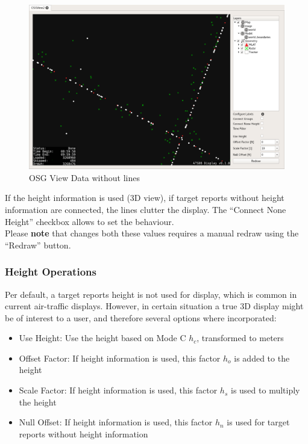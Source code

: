 {\begin{figure}[H]
    \hspace*{-2cm}
    \includegraphics[width=18cm,frame]{../screenshots/osgview_no_lines.png}
  \caption{OSG View Data without lines}
\end{figure}

If the height information is used (3D view), if target reports without height information are connected, the lines clutter the display. The ``Connect None Height'' checkbox allows to set the behaviour. \\

Please \textbf{note} that changes both these values requires a manual redraw using the ``Redraw'' button.

\subsubsection{Height Operations}

Per default, a target reports height is not used for display, which is common in current air-traffic displays. However, in certain situation a true 3D display might be of interest to a user, and therefore several options where incorporated:

\begin{itemize}
 \item Use Height: Use the height based on Mode C $h_c$, transformed to meters
 \item Offset Factor: If height information is used, this factor $h_o$ is added to the height
 \item Scale Factor: If height information is used, this factor $h_s$ is used to multiply the height
 \item Null Offset: If height information is used, this factor $h_n$ is used for target reports without height information
\end{itemize}

}
